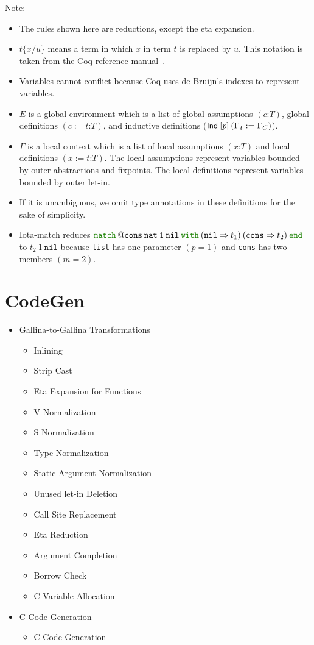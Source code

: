 \documentclass[a4paper,fleqn]{article}
\def\coq{\textrm{Coq}}
\def\gallina{\textrm{Gallina}}
\newcommand{\kwmatch}{\mbox{\color{mygreen}\ttfamily match}}
\newcommand{\kwwith}{\mbox{\color{mygreen}\ttfamily with}}
\newcommand{\kwend}{\mbox{\color{mygreen}\ttfamily end}}
\newcommand{\gassum}[2]{(#1\mathord{:}#2)}
\newcommand{\glodef}[3]{(#1:=#2\mathord{:}#3)}
\newcommand{\lassum}[2]{(#1\mathord{:}#2)}
\newcommand{\ldef}[3]{(#1:=#2\mathord{:}#3)}
\newcommand{\subst}[3]{#1\{#2/#3\}}
\begin{document}
{\small Note:
\begin{itemize}
  \item The rules shown here are reductions, except the eta expansion.
  \item $\subst{t}{x}{u}$ means a term in which $x$ in term $t$ is replaced by $u$.
    This notation is taken from the Coq reference manual~\cite{coqrefman8.12.0}.
  \item Variables cannot conflict because \coq{} uses de Bruijn's indexes to represent variables.
  \item $E$ is a global environment which is a list of
    global assumptions $\gassum{c}{T}$,
    global definitions $\glodef{c}{t}{T}$, and
    inductive definitions ($\text{\sf Ind}\:[p]\:(\Gamma_I := \Gamma_C)$).
  \item $\Gamma$ is a local context which is a list of
    local assumptions $\lassum{x}{T}$ and
    local definitions $\ldef{x}{t}{T}$.
    The local assumptions represent variables bounded by outer abstractions and fixpoints.
    The local definitions represent variables bounded by outer let-in.
  \item If it is unambiguous, we omit type annotations in these definitions for the sake of simplicity.
  \item Iota-match reduces $\kwmatch\:\mathtt{@cons\:nat\:1\:nil}\:\kwwith\:(\mathtt{nil} \Rightarrow t_1)\:(\mathtt{cons} \Rightarrow t_2)\:\kwend$ to $t_2\:1\:\mathtt{nil}$
    because \lstinline!list! has one parameter $(p=1)$ and \lstinline!cons! has two members $(m=2)$.
\end{itemize}}

\section{CodeGen}\label{sec:codegen}

\begin{itemize}
\item \gallina-to-\gallina{} Transformations
  \begin{itemize}
  \item Inlining
  \item Strip Cast
  \item Eta Expansion for Functions
  \item V-Normalization
  \item S-Normalization
  \item Type Normalization
  \item Static Argument Normalization
  \item Unused let-in Deletion
  \item Call Site Replacement
  \item Eta Reduction
  \item Argument Completion
  \item Borrow Check
  \item C Variable Allocation
  \end{itemize}
\item C Code Generation
  \begin{itemize}
  \item C Code Generation
  \end{itemize}
\end{itemize}
\end{document}

